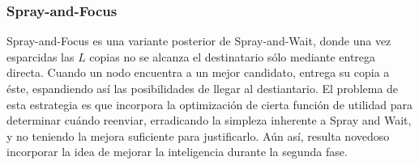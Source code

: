 \subsubsection{Spray-and-Focus}
Spray-and-Focus\cite{sandf} es una variante posterior de Spray-and-Wait, donde una vez esparcidas las $L$ copias no se alcanza el destinatario sólo mediante entrega directa. Cuando un nodo encuentra a un mejor candidato, entrega su copia a éste, espandiendo así las posibilidades de llegar al destiantario. El problema de esta estrategia es que incorpora la optimización de cierta función de utilidad para determinar cuándo reenviar, erradicando la simpleza inherente a Spray and Wait, y no teniendo la mejora suficiente para justificarlo. Aún así, resulta novedoso incorporar la idea de mejorar la inteligencia durante la segunda fase.